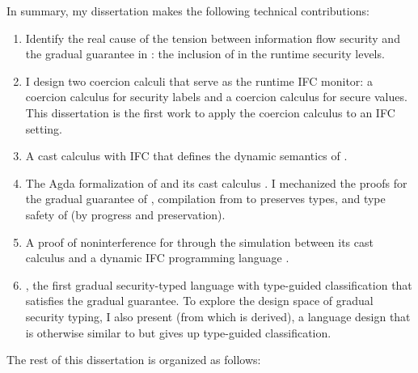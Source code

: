 In summary, my dissertation makes the following technical contributions:

\begin{enumerate}
\item Identify the real cause of the tension between information flow security
  and the gradual guarantee in \GSLRef: the inclusion of \unk in the
  runtime security levels.
\item I design two coercion calculi that serve as the runtime IFC monitor:
   a coercion calculus for security labels and  a coercion
  calculus for secure values. This dissertation is the first work to apply the
  coercion calculus to an IFC setting.
\item A cast calculus \CC with IFC that defines the dynamic semantics of
  \Surface.
\item The Agda formalization of \Surface and its cast calculus \CC. I mechanized
  the proofs for  the gradual guarantee of \Surface, 
  compilation from \Surface to \CC preserves types, and  type safety
  of \CC (by progress and preservation).
\item A proof of noninterference for \Surface through the simulation between its
  cast calculus \CC and a dynamic IFC programming language \DynIFC.
\item \Surface, the first gradual security-typed language with type-guided
  classification that satisfies the gradual guarantee. To explore the design
  space of gradual security typing, I also present \SurfaceOld (from which
  \DynIFC is derived), a language design that is otherwise similar to \Surface
  but gives up type-guided classification.
\end{enumerate}

The rest of this dissertation is organized as follows:

